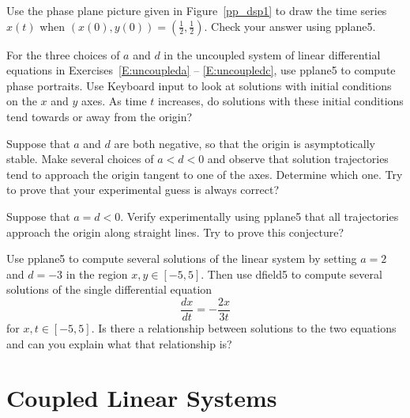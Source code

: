 \begin{exercise} \label{c3.4.3}
Use the phase plane picture given in Figure~\ref{pp_dsp1} to
draw the time series $x(t)$ when $(x(0),y(0)) =
(\frac{1}{2},\frac{1}{2})$.  Check your answer using {\sf
pplane5}.
\end{exercise}

\CEXER


\begin{exercise} \label{c3.4.4}
For the three choices of $a$ and $d$ in the uncoupled system of
linear differential equations in Exercises~\ref{E:uncoupleda} -- 
\ref{E:uncoupledc}, use {\sf pplane5}
to compute phase portraits.  Use {\sf Keyboard input} to look at
solutions with initial conditions on the $x$ and $y$ axes.  As time
$t$ increases, do solutions with these initial conditions tend towards 
or away from the origin?
\end{exercise}

\begin{exercise} \label{c3.4.5}
Suppose that $a$ and $d$ are both negative, so that the origin
is asymptotically stable.  Make several choices of $a<d<0$ and
observe that solution trajectories tend to approach the origin
tangent to one of the axes.  Determine which one.  Try to prove
that your experimental guess is always correct?
\end{exercise}

\begin{exercise} \label{c3.4.6}
Suppose that $a=d<0$.  Verify experimentally using {\sf pplane5}
that all trajectories approach the origin along straight lines.
Try to prove this conjecture?
\end{exercise}

\begin{exercise} \label{c3.4.7}
Use {\sf pplane5} to compute several solutions of the linear system by
setting $a=2$ and $d=-3$ in the region $x,y\in[-5,5]$.  Then use
{\sf dfield5} to compute several solutions of the single differential
equation
\[
\frac{dx}{dt} = -\frac{2x}{3t}
\]
for $x,t\in[-5,5]$.  Is there a relationship between solutions to the
two equations and can you explain what that relationship is?
\end{exercise}



\section{Coupled Linear Systems}  \label{s:3.5}


